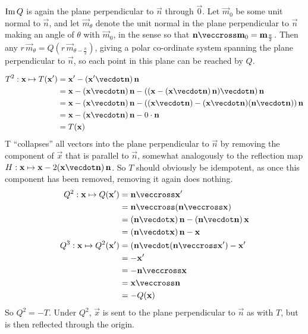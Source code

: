\documentclass[fleqn,a4paper,11pt]{article}
\begin{document}
\begin{enumerate}[label=\textbf{\arabic*.}]
\begin{enumerate}[label=(\alph*)]
      \(\operatorname{Im} Q\) is again the plane perpendicular to \(\vec n\) through
      \(\vec 0\). Let \(\vec m_0\) be some unit normal to \(\vec n\), and let
      \(\vec m_\theta\) denote the unit normal in the plane perpendicular to
      \(\vec n\) making an angle of \(\theta\) with \(\vec m_0\), in the sense
      so that \(\vec n \veccross \vec m_0 = \vec m_{\frac \pi 2}\). Then any
      \(r\,\vec m_\theta = Q(r\,\vec m_{\theta - \frac \pi 2})\), giving a polar
      co-ordinate system spanning the plane perpendicular to \(\vec n\), so each
      point in this plane can be reached by \(Q\).
    \end{enumerate}
    \begin{align*}
     T^2 : \vec x \mapsto T(\vec x')
      &= \vec x' - (\vec x' \vecdot \vec n)\,\vec n \\
      &= \vec x - (\vec x \vecdot \vec n)\, \vec n -
         ((\vec x - (\vec x \vecdot \vec n)\, \vec n) \vecdot \vec n)\,\vec n \\
      &= \vec x - (\vec x \vecdot \vec n)\, \vec n -
         ((\vec x \vecdot \vec n) -
          (\vec x \vecdot \vec n)(\vec n \vecdot \vec n))\,\vec n \\
      &= \vec x - (\vec x \vecdot \vec n)\, \vec n -
         0 \cdot \vec n \\
      &= T(\vec x)
    \end{align*}
    T ``collapses'' all vectors into the plane perpendicular to \(\vec n\) by
    removing the component of \(\vec x\) that is parallel to \(\vec n\),
    somewhat analogously to the reflection map
    \(H: \vec x \mapsto \vec x - 2 (\vec x \vecdot \vec n)\,\vec n\). So \(T\)
    should obviously be idempotent, as once this component has been removed,
    removing it again does nothing.
    \begin{align*}
     Q^2: \vec x \mapsto Q(\vec x')
      &= \vec n \veccross \vec x' \\
      &= \vec n \veccross (\vec n \veccross \vec x) \\
      &= (\vec n \vecdot \vec x)\,\vec n - (\vec n \vecdot \vec n)\,\vec x \\
      &= (\vec n \vecdot \vec x)\,\vec n - \vec x \\
     Q^3: \vec x \mapsto Q^2(\vec x')
      &= (\vec n \vecdot (\vec n \veccross \vec x') - \vec x' \\
      &= -\vec x' \\
      &= - \vec n \veccross \vec x \\
      &= \vec x \veccross \vec n \\
      &= -Q(\vec x)
    \end{align*}
    So \(Q^2 = -T\). Under \(Q^2\), \(\vec x\) is sent to the plane perpendicular
    to \(\vec n\) as with \(T\), but is then reflected through the origin.


\end{enumerate}
\end{document}
